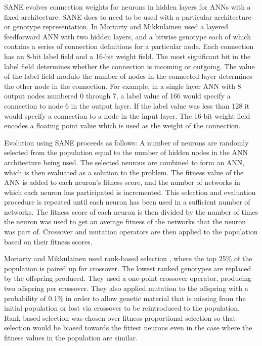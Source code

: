 \documentclass[12pt]{article} %
\begin{document}
SANE evolves connection weights for neurons in hidden layers for ANNs with a fixed architecture. SANE does to need to be used with a particular architecture or genotype representation. In \cite{Moriarty1996} Moriarty and Mikkulainen used a layered feedforward ANN with two hidden layers, and a bitwise genotype each of which contains a series of connection definitions for a particular node. Each connection has an 8-bit label field and a 16-bit weight field. The most significant bit in the label field determines whether the connection is incoming or outgoing. The value of the label field modulo the number of nodes in the connected layer determines the other node in the connection. For example, in a single layer ANN with 8 output nodes numbered 0 through 7, a label value of 166 would specify a connection to node 6 in the output layer. If the label value was less than 128 it would specify a connection to a node in the input layer. The 16-bit weight field encodes a floating point value which is used as the weight of the connection.

Evolution using SANE proceeds as follows: A number of neurons are randomly selected from the population equal to the number of hidden nodes in the ANN architecture being used. The selected neurons are combined to form an ANN, which is then evaluated as a solution to the problem. The fitness value of the ANN is added to each neuron's fitness score, and the number of networks in which each neuron has participated is incremented. This selection and evaluation procedure is repeated until each neuron has been used in a sufficient number of networks. The fitness score of each neuron is then divided by the number of times the neuron was used to get an average fitness of the networks that the neuron was part of. Crossover and mutation operators are then applied to the population based on their fitness scores.

Moriarty and Mikkulainen \cite{Moriarty1996} used rank-based selection \cite{Goldberg1991}, where the top 25\% of the population is paired up for crossover. The lowest ranked genotypes are replaced by the offspring produced. They used a one-point crossover operator, producing two offspring per crossover. They also applied mutation to the offspring with a probability of 0.1\% in order to allow genetic material that is missing from the initial population or lost via crossover to be reintroduced to the population. Rank-based selection was chosen over fitness-proportional selection \cite{Goldberg1991} so that selection would be biased towards the fittest neurons even in the case where the fitness values in the population are similar.
\end{document}
